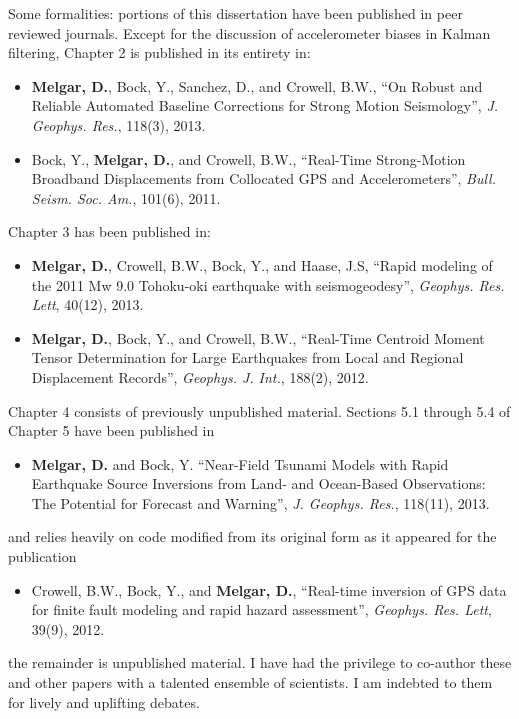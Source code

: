 \begin{frontmatter}
\begin{acknowledgements}
Some formalities: portions of this dissertation have been published in peer reviewed journals. Except for the discussion of accelerometer biases in Kalman filtering, Chapter 2 is published in its entirety in:
\begin{itemize}
\item \textbf{Melgar, D.}, Bock, Y., Sanchez, D., and Crowell, B.W., ``On Robust and Reliable Automated Baseline Corrections for Strong Motion Seismology'', \emph{J. Geophys. Res.}, 118(3), 2013.
\item Bock, Y., \textbf{Melgar, D.}, and Crowell, B.W., ``Real-Time Strong-Motion Broadband Displacements from Collocated GPS and Accelerometers'', \emph{Bull. Seism. Soc. Am.}, 101(6), 2011.
\end{itemize}
Chapter 3 has been published in:
\begin{itemize}
\item \textbf{Melgar, D.}, Crowell, B.W., Bock, Y., and Haase, J.S, ``Rapid modeling of the 2011 Mw 9.0 Tohoku-oki earthquake with seismogeodesy'', \emph{Geophys. Res. Lett}, 40(12), 2013.
\item \textbf{Melgar, D.}, Bock, Y., and Crowell, B.W., ``Real-Time Centroid Moment Tensor Determination for Large Earthquakes from Local and Regional Displacement Records'', \emph{Geophys. J. Int.}, 188(2), 2012.
\end{itemize}
Chapter 4 consists of previously unpublished material. Sections 5.1 through 5.4 of Chapter 5 have been published in
\begin{itemize}
\item \textbf{Melgar, D.} and Bock, Y. ``Near-Field Tsunami Models with Rapid Earthquake Source Inversions from Land- and Ocean-Based Observations: The Potential for Forecast and Warning'', \emph{J. Geophys. Res.}, 118(11), 2013.
\end{itemize}
and relies heavily on code modified from its original form as it appeared for the publication
\begin{itemize}
\item Crowell, B.W., Bock, Y., and \textbf{Melgar, D.}, ``Real-time inversion of GPS data for finite fault modeling and rapid hazard assessment'', \emph{Geophys. Res. Lett}, 39(9), 2012.
\end{itemize}
the remainder is unpublished material. I have had the privilege to co-author these and other papers with a talented ensemble of scientists. I am indebted to them for lively and uplifting debates.


\end{acknowledgements}



\end{frontmatter}
